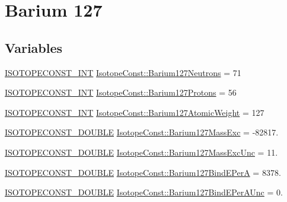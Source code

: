 \hypertarget{group___isotope_const-_barium-_ba127}{}\section{Barium 127}
\label{group___isotope_const-_barium-_ba127}
\subsection*{Variables}
\begin{DoxyCompactItemize}
\item 
\mbox{\hyperlink{group___isotope_const-_macros_ga5f18360b3e99483a35c32d789e62621c}{I\+S\+O\+T\+O\+P\+E\+C\+O\+N\+S\+T\+\_\+\+I\+NT}} \mbox{\hyperlink{group___isotope_const-_barium-_ba127_gaa449dedf7f975388449f726339c03db5}{Isotope\+Const\+::\+Barium127\+Neutrons}} = 71
\item 
\mbox{\hyperlink{group___isotope_const-_macros_ga5f18360b3e99483a35c32d789e62621c}{I\+S\+O\+T\+O\+P\+E\+C\+O\+N\+S\+T\+\_\+\+I\+NT}} \mbox{\hyperlink{group___isotope_const-_barium-_ba127_ga124b4d4b54d95b51543867dfb092ead2}{Isotope\+Const\+::\+Barium127\+Protons}} = 56
\item 
\mbox{\hyperlink{group___isotope_const-_macros_ga5f18360b3e99483a35c32d789e62621c}{I\+S\+O\+T\+O\+P\+E\+C\+O\+N\+S\+T\+\_\+\+I\+NT}} \mbox{\hyperlink{group___isotope_const-_barium-_ba127_ga90e246bb0c8ab9031761530752aed33e}{Isotope\+Const\+::\+Barium127\+Atomic\+Weight}} = 127
\item 
\mbox{\hyperlink{group___isotope_const-_macros_ga8f45a7272ce02c0b4c65c44636ed719a}{I\+S\+O\+T\+O\+P\+E\+C\+O\+N\+S\+T\+\_\+\+D\+O\+U\+B\+LE}} \mbox{\hyperlink{group___isotope_const-_barium-_ba127_ga892b2b0622a9736ee9ee10c21660345b}{Isotope\+Const\+::\+Barium127\+Mass\+Exc}} = -\/82817.
\item 
\mbox{\hyperlink{group___isotope_const-_macros_ga8f45a7272ce02c0b4c65c44636ed719a}{I\+S\+O\+T\+O\+P\+E\+C\+O\+N\+S\+T\+\_\+\+D\+O\+U\+B\+LE}} \mbox{\hyperlink{group___isotope_const-_barium-_ba127_ga19590c3e374d5c7e7814909561ad9cf5}{Isotope\+Const\+::\+Barium127\+Mass\+Exc\+Unc}} = 11.
\item 
\mbox{\hyperlink{group___isotope_const-_macros_ga8f45a7272ce02c0b4c65c44636ed719a}{I\+S\+O\+T\+O\+P\+E\+C\+O\+N\+S\+T\+\_\+\+D\+O\+U\+B\+LE}} \mbox{\hyperlink{group___isotope_const-_barium-_ba127_ga8d8aa280e24ffcc04f4908f8c44ba04e}{Isotope\+Const\+::\+Barium127\+Bind\+E\+PerA}} = 8378.
\item 
\mbox{\hyperlink{group___isotope_const-_macros_ga8f45a7272ce02c0b4c65c44636ed719a}{I\+S\+O\+T\+O\+P\+E\+C\+O\+N\+S\+T\+\_\+\+D\+O\+U\+B\+LE}} \mbox{\hyperlink{group___isotope_const-_barium-_ba127_gafd43d9e4184eac62b51aa683c902bdae}{Isotope\+Const\+::\+Barium127\+Bind\+E\+Per\+A\+Unc}} = 0.

\end{DoxyCompactItemize}
